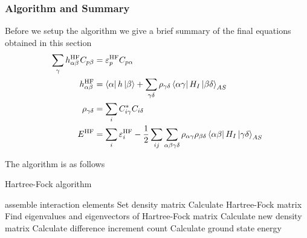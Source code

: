     \subsubsection{Algorithm and Summary}
        Before we setup the algorithm we give a brief summary of the final
        equations obtained in this section
            \begin{equation}
                \begin{aligned}
                    \sum_{\gamma} h^{\text{HF}}_{\alpha\beta}C_{p\beta} &=
                    \varepsilon^{\text{HF}}_pC_{p\alpha} \\
                    h^{\text{HF}}_{\alpha\beta} &= \bra{\alpha}h\ket{\beta} +
                    \sum_{\gamma\delta} \rho_{\gamma\delta}
                    \bra{\alpha\gamma}H_I\ket{\beta\delta}_{AS} \\
                    \rho_{\gamma\delta} &= \sum_i C^{*}_{i\gamma}C_{i\delta} \\
                    E^{\text{HF}} &= \sum_{i} \varepsilon^{\text{HF}}_i -
                    \frac{1}{2}\sum_{ij}\sum_{\alpha\beta\gamma\delta}
                    \rho_{\alpha\gamma}\rho_{\beta\delta}
                    \bra{\alpha\beta}H_I\ket{\gamma\delta}_{AS}
                \end{aligned}
                \label{eq:HFsummary}
            \end{equation}
        
        The algorithm is as follows
            \begin{algorithm}[H]
            \caption{Hartree-Fock algorithm}\label{alg:hartreeFock}
            \begin{algorithmic}[1]
                \State assemble interaction elements
                \State Set density matrix 
                    \State Calculate Hartree-Fock matrix 
                    \State Find eigenvalues and eigenvectors of Hartree-Fock matrix
                    \State Calculate new density matrix
                    \State Calculate difference 
                    \State increment count
                \EndWhile
                \State Calculate ground state energy 
            \end{algorithmic}
            \end{algorithm}

